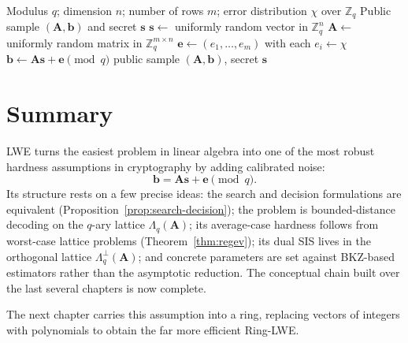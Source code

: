 \begin{algorithm}[H]
\caption{Generate an LWE Sample}
\label{alg:lwe-sample}
\begin{algorithmic}[1]
\Require Modulus $q$; dimension $n$; number of rows $m$; error distribution $\chi$ over $\mathbb{Z}_q$
\Ensure Public sample $(\mathbf{A},\mathbf{b})$ and secret $\mathbf{s}$
\State $\mathbf{s} \gets$ uniformly random vector in $\mathbb{Z}_q^{n}$ 
\State $\mathbf{A} \gets$ uniformly random matrix in $\mathbb{Z}_q^{m \times n}$ 
\State $\mathbf{e} \gets (e_1,\dots,e_m)$ with each $e_i \gets \chi$ 
\State $\mathbf{b} \gets \mathbf{A}\mathbf{s} + \mathbf{e} \pmod q$ 
\State \Return public sample $(\mathbf{A},\mathbf{b})$, secret $\mathbf{s}$
\end{algorithmic}
\end{algorithm}

\section{Summary}

LWE turns the easiest problem in linear algebra into one of the most robust hardness assumptions in cryptography by adding calibrated noise:
\[
\mathbf{b}=\mathbf{A}\mathbf{s}+\mathbf{e}\pmod q.
\]
Its structure rests on a few precise ideas: the search and decision formulations are equivalent (Proposition~\ref{prop:search-decision}); the problem is bounded-distance decoding on the $q$-ary lattice $\Lambda_q(\mathbf{A})$; its average-case hardness follows from worst-case lattice problems (Theorem~\ref{thm:regev}); its dual SIS lives in the orthogonal lattice $\Lambda_q^{\perp}(\mathbf{A})$; and concrete parameters are set against BKZ-based estimators rather than the asymptotic reduction. The conceptual chain built over the last several chapters is now complete.

\begin{center}
\end{center}

The next chapter carries this assumption into a ring, replacing vectors of integers with polynomials to obtain the far more efficient Ring-LWE.

\printbibliography[heading=chapterrefs]

